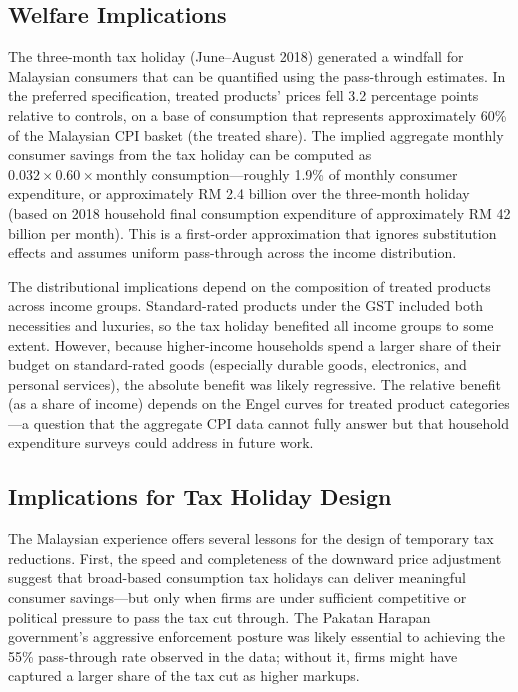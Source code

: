 \documentclass[12pt]{article}
\begin{document}
\subsection{Welfare Implications}

The three-month tax holiday (June--August 2018) generated a windfall for Malaysian consumers that can be quantified using the pass-through estimates. In the preferred specification, treated products' prices fell 3.2 percentage points relative to controls, on a base of consumption that represents approximately 60\% of the Malaysian CPI basket (the treated share). The implied aggregate monthly consumer savings from the tax holiday can be computed as $0.032 \times 0.60 \times \text{monthly consumption}$---roughly 1.9\% of monthly consumer expenditure, or approximately RM 2.4 billion over the three-month holiday (based on 2018 household final consumption expenditure of approximately RM 42 billion per month). This is a first-order approximation that ignores substitution effects and assumes uniform pass-through across the income distribution.

The distributional implications depend on the composition of treated products across income groups. Standard-rated products under the GST included both necessities and luxuries, so the tax holiday benefited all income groups to some extent. However, because higher-income households spend a larger share of their budget on standard-rated goods (especially durable goods, electronics, and personal services), the absolute benefit was likely regressive. The relative benefit (as a share of income) depends on the Engel curves for treated product categories---a question that the aggregate CPI data cannot fully answer but that household expenditure surveys could address in future work.

\subsection{Implications for Tax Holiday Design}

The Malaysian experience offers several lessons for the design of temporary tax reductions. First, the speed and completeness of the downward price adjustment suggest that broad-based consumption tax holidays can deliver meaningful consumer savings---but only when firms are under sufficient competitive or political pressure to pass the tax cut through. The Pakatan Harapan government's aggressive enforcement posture was likely essential to achieving the 55\% pass-through rate observed in the data; without it, firms might have captured a larger share of the tax cut as higher markups.
\end{document}

